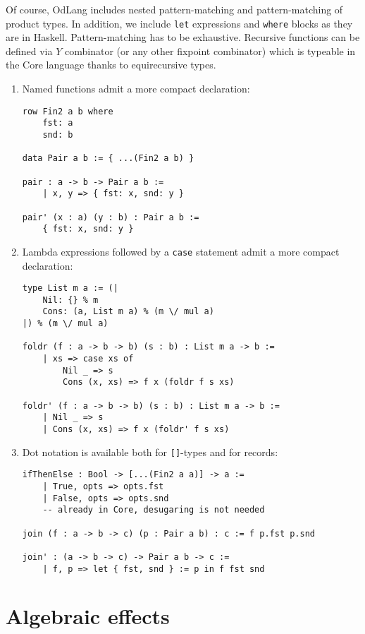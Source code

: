 \documentclass[a4paper,14pt]{extreport}
\begin{document}
Of course, OdLang includes nested pattern-matching and pattern-matching of
product types. In addition, we include \verb|let| expressions and \verb|where|
blocks as they are in Haskell. Pattern-matching has to be exhaustive. Recursive
functions can be defined via $Y$ combinator (or any other fixpoint combinator)
which is typeable in the Core language thanks to equirecursive types.

\begin{enumerate}
    \item Named functions admit a more compact declaration:
\begin{verbatim}
row Fin2 a b where
    fst: a
    snd: b

data Pair a b := { ...(Fin2 a b) }

pair : a -> b -> Pair a b :=
    | x, y => { fst: x, snd: y }

pair' (x : a) (y : b) : Pair a b :=
    { fst: x, snd: y }
\end{verbatim}
    \item Lambda expressions followed by a \verb|case| statement admit a more
        compact declaration:
\begin{verbatim}
type List m a := (|
    Nil: {} % m
    Cons: (a, List m a) % (m \/ mul a)
|) % (m \/ mul a)

foldr (f : a -> b -> b) (s : b) : List m a -> b :=
    | xs => case xs of
        Nil _ => s
        Cons (x, xs) => f x (foldr f s xs)

foldr' (f : a -> b -> b) (s : b) : List m a -> b :=
    | Nil _ => s
    | Cons (x, xs) => f x (foldr' f s xs)
\end{verbatim}
    \item Dot notation is available both for \verb|[]|-types and for records:
\begin{verbatim}
ifThenElse : Bool -> [...(Fin2 a a)] -> a :=
    | True, opts => opts.fst
    | False, opts => opts.snd
    -- already in Core, desugaring is not needed

join (f : a -> b -> c) (p : Pair a b) : c := f p.fst p.snd

join' : (a -> b -> c) -> Pair a b -> c :=
    | f, p => let { fst, snd } := p in f fst snd
\end{verbatim}
\end{enumerate}

\section{Algebraic effects}
\end{document}
